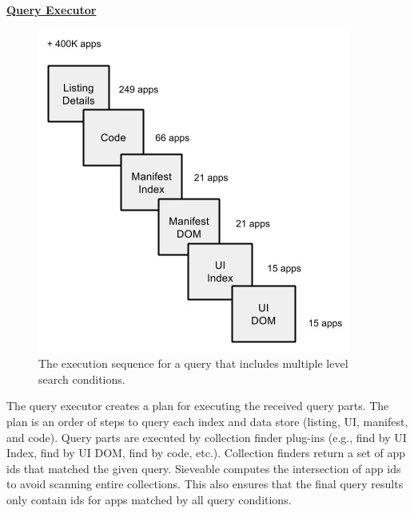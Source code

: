 \underline{\textbf{Query Executor}}
\begin{figure}
	\centering
	\includegraphics[scale=0.5]{figures/sieveable-deep-search/queryExecution}
	\caption{The execution sequence for a query that includes multiple level search conditions.}
	\label{fig:fig_query_execution}
\end{figure}
The query executor creates a plan for executing the received query parts.
The plan is an order of steps to query each index and data store (listing, UI, manifest, and code).
Query parts are executed by collection finder plug-ins (e.g., find by UI Index, find by UI DOM, find by code, etc.).
Collection finders return a set of app ids that matched the given query.
Sieveable computes the intersection of app ids to avoid scanning entire collections.
This also ensures that the final query results only contain ids for apps matched by all query conditions.

